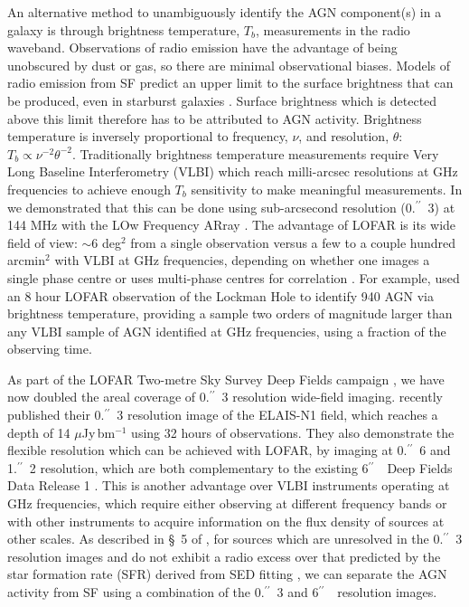 \documentclass[usenatbib,fleqn,letters]{mnras}
\newcommand{\sarc}{$^{\prime\prime}\!\!$}
\begin{document}
An alternative method to unambiguously identify the AGN component(s) in a galaxy is through brightness temperature, $T_b$, measurements in the radio waveband. Observations of radio emission have the advantage of being unobscured by dust or gas, so there are minimal observational biases. 
Models of radio emission from SF predict an upper limit to the surface brightness that can be produced, even in starburst galaxies \citep{condon_radio_1992}. Surface brightness which is detected above this limit therefore has to be attributed to AGN activity. Brightness temperature is inversely proportional to frequency, $\nu$, and resolution, $\theta$: $T_b \propto \nu^{-2}\theta^{-2}$. Traditionally brightness temperature measurements require Very Long Baseline Interferometry (VLBI) which reach milli-arcsec resolutions at GHz frequencies \citep[e.g.,][]{middelberg_mosaiced_2013,herrera_ruiz_faint_2017,radcliffe_nowhere_2018} to achieve enough $T_b$ sensitivity to make meaningful measurements. In \citet[][hereafter, ]{morabito_identifying_2022} we demonstrated that this can be done using sub-arcsecond resolution (0.\sarc\ 3) at 144 MHz with the LOw Frequency ARray \citep[LOFAR;][]{van_haarlem_lofar:_2013}. The advantage of LOFAR is its wide field of view: $\sim$6 deg$^2$ from a single observation versus a few to a couple hundred arcmin$^2$ with VLBI at GHz frequencies, depending on whether one images a single phase centre or uses multi-phase centres for correlation \citep{deller_difx-2:_2011,morgan_vlbi_2011}. For example,  used an 8 hour LOFAR observation of the Lockman Hole \citep{sweijen_deep_2022} to identify 940 AGN via brightness temperature, providing a sample two orders of magnitude larger than any VLBI sample of AGN identified at GHz frequencies, using a fraction of the observing time.

As part of the LOFAR Two-metre Sky Survey Deep Fields campaign \cite[][hereafter, ]{best_lofar_2023}, we have now doubled the areal coverage of 0.\sarc\ 3 resolution wide-field imaging. \cite{de_jong_into_2024} recently published their 0.\sarc\ 3 resolution image of the ELAIS-N1 field, which reaches a depth of 14 $\mu$Jy$\,$bm$^{-1}$ using 32 hours of observations. They also demonstrate the flexible resolution which can be achieved with LOFAR, by imaging at 0.\sarc\ 6 and 1.\sarc\ 2 resolution, which are both complementary to the existing 6\sarc\ \ Deep Fields Data Release 1 \citep[DR1;][]{sabater_lofar_2021,tasse_lofar_2021}. This is another advantage over VLBI instruments operating at GHz frequencies, which require either observing at different frequency bands or with other instruments to acquire information on the flux density of sources at other scales. As described in \S~5 of , for sources which are unresolved in the 0.\sarc\ 3 resolution images and do not exhibit a radio excess over that predicted by the star formation rate (SFR) derived from SED fitting , we can separate the AGN activity from SF using a combination of the 0.\sarc\ 3 and 6\sarc\ \ resolution images. 
\end{document}
